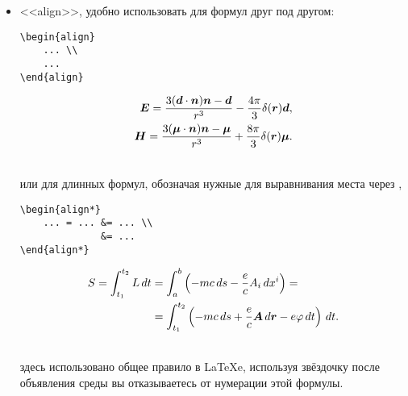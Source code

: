 \begin{itemize}
\item <<align>>, удобно использовать для формул друг под другом: \\
\begin{minipage}{0.45\textwidth}
    \begin{lstlisting}
\begin{align}
    ... \\
    ...
\end{align}
\end{lstlisting}
\end{minipage}
\hfill
\vline
\hfill
\begin{minipage}{0.45\textwidth}
    \begin{align}
        \mbox{\boldmath $E$} = \frac{3 (\mbox{\boldmath $d$} \cdot \mbox{\boldmath $n$}) \mbox{\boldmath $n$} - \mbox{\boldmath $d$}}{r^3} - \frac{4\pi}{3} \delta(\mbox{\boldmath $r$}) \mbox{\boldmath $d$}, \\
        \mbox{\boldmath $H$} = \frac{3 (\mbox{\boldmath $\mu$} \cdot \mbox{\boldmath $n$}) \mbox{\boldmath $n$} - \mbox{\boldmath $\mu$}}{r^3} + \frac{8\pi}{3} \delta(\mbox{\boldmath $r$}) \mbox{\boldmath $\mu$}.
    \end{align}
\end{minipage}
\\ или для длинных формул, обозначая нужные для выравнивания места через \codeword{&}, \\
\begin{minipage}{0.45\textwidth}
    \begin{lstlisting}
\begin{align*}
    ... = ... &= ... \\
              &= ...
\end{align*}
\end{lstlisting}
\end{minipage}
\hfill
\vline
\hfill
\begin{minipage}{0.45\textwidth}
    \begin{align*}
        S = \int_{t_1}^{t_2} L \, d t &= \int_{a}^{b} \left(-mc \, d s - \frac{e}{c} A_i \, d x^i\right) = \\
        &= \int_{t_1}^{t_2} \left(
            - mc \, d s + \frac{e}{c} \mbox{\boldmath $A$} \, d \mbox{\boldmath $r$} - e \varphi \, d t
        \right) \, d t.
    \end{align*}
\end{minipage}
\\ здесь использовано общее правило в \LaTeX e, используя звёздочку после объявления среды  вы отказываетесь от нумерации этой формулы.


\end{itemize}

